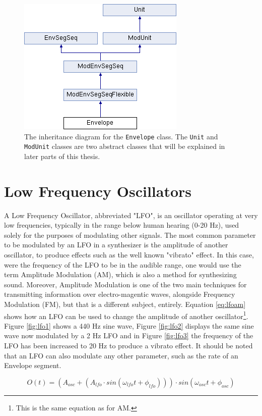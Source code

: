 \documentclass[12pt,twoside]{report}
\begin{document}
\begin{figure}
  \includegraphics[scale=0.7]{img/envelope-inherit}
  \caption{The inheritance diagram for the \texttt{Envelope} class. The \texttt{Unit} and \texttt{ModUnit} classes are two abstract classes that will be explained in later parts of this thesis.}
  \label{fig:envelope-inherit}
\end{figure}

\section{Low Frequency Oscillators}

A Low Frequency Oscillator, abbreviated "LFO", is an oscillator operating at very low frequencies, typically in the range below human hearing (0-20 Hz), used solely for the purposes of modulating other signals. The most common parameter to be modulated by an LFO in a synthesizer is the amplitude of another oscillator, to produce effects such as the well known "vibrato" effect. In this case, were the frequency of the LFO to be in the audible range, one would use the term Amplitude Modulation (AM), which is also a method for synthesizing sound. Moreover, Amplitude Modulation is one of the two main techniques for transmitting information over electro-magentic waves, alongside Frequency Modulation (FM), but that is a different subject, entirely. Equation \ref{eq:lfoam} shows how an LFO can be used to change the amplitude of another oscillator\footnote{This is the same equation as for AM.}. Figure \ref{fig:lfo1} shows a 440 Hz sine wave, Figure \ref{fig:lfo2} displays the same sine wave now modulated by a 2 Hz LFO and in Figure \ref{fig:lfo3} the frequency of the LFO has been increased to 20 Hz to produce a vibrato effect. It should be noted that an LFO can also modulate any other parameter, such as the rate of an Envelope segment.

\begin{equation}
  O(t) = (A_{osc} + (A_{lfo} \cdot sin(\omega_{lfo}t + \phi_{lfo}))) \cdot sin(\omega_{osc}t + \phi_{osc})
  \label{eq:lfoam}
\end{equation}
\end{document}
